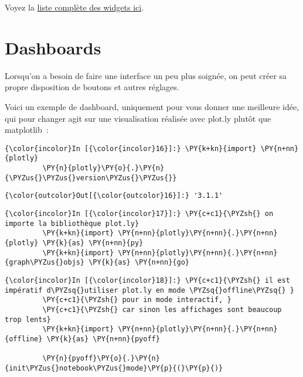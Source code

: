     Voyez la
\href{http://ipywidgets.readthedocs.io/en/latest/examples/Widget\%20List.html}{liste
complète des widgets ici}.

    \hypertarget{dashboards}{%
\section{Dashboards}\label{dashboards}}

    Lorsqu'on a besoin de faire une interface un peu plus soignée, on peut
créer sa propre disposition de boutons et autres réglages.

    Voici un exemple de dashboard, uniquement pour vous donner une meilleure
idée, qui pour changer agit sur une visualisation réalisée avec plot.ly
plutôt que matplotlib~:

    \begin{Verbatim}[commandchars=\\\{\}]
{\color{incolor}In [{\color{incolor}16}]:} \PY{k+kn}{import} \PY{n+nn}{plotly}
         \PY{n}{plotly}\PY{o}{.}\PY{n}{\PYZus{}\PYZus{}version\PYZus{}\PYZus{}}
\end{Verbatim}


\begin{Verbatim}[commandchars=\\\{\}]
{\color{outcolor}Out[{\color{outcolor}16}]:} '3.1.1'
\end{Verbatim}
            
    \begin{Verbatim}[commandchars=\\\{\}]
{\color{incolor}In [{\color{incolor}17}]:} \PY{c+c1}{\PYZsh{} on importe la bibliothèque plot.ly}
         \PY{k+kn}{import} \PY{n+nn}{plotly}\PY{n+nn}{.}\PY{n+nn}{plotly} \PY{k}{as} \PY{n+nn}{py}
         \PY{k+kn}{import} \PY{n+nn}{plotly}\PY{n+nn}{.}\PY{n+nn}{graph\PYZus{}objs} \PY{k}{as} \PY{n+nn}{go}
\end{Verbatim}


    \begin{Verbatim}[commandchars=\\\{\}]
{\color{incolor}In [{\color{incolor}18}]:} \PY{c+c1}{\PYZsh{} il est impératif d\PYZsq{}utiliser plot.ly en mode \PYZsq{}offline\PYZsq{} }
         \PY{c+c1}{\PYZsh{} pour in mode interactif, }
         \PY{c+c1}{\PYZsh{} car sinon les affichages sont beaucoup trop lents}
         \PY{k+kn}{import} \PY{n+nn}{plotly}\PY{n+nn}{.}\PY{n+nn}{offline} \PY{k}{as} \PY{n+nn}{pyoff}
         
         \PY{n}{pyoff}\PY{o}{.}\PY{n}{init\PYZus{}notebook\PYZus{}mode}\PY{p}{(}\PY{p}{)}
\end{Verbatim}


